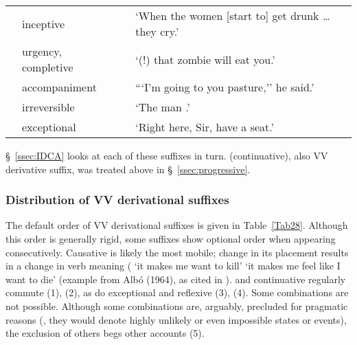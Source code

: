 \begin{table}[!ht]
\begin{small}
\begin{center}
\begin{tabularx}{\textwidth}{l@{ }lL@{ }L}
		&inceptive			& 	&`When the women [start to] get drunk \dots{} they cry.'\\[0.5ex]
		&urgency, completive&	&`(!) that zombie will eat you.'\\[0.5ex]
	&accompaniment		&	&```I'm going to  you pasture,'' he said.'\\[0.5ex]
	&irreversible 		&	&`The man .'\\[0.5ex]
	&exceptional		&	&`Right here, Sir,  have a seat.'\\
\bottomrule
\end{tabularx}
\end{center}
\end{small}
\end{table}

\S~\ref{ssec:IDCA} looks at each of these suffixes in turn.  (continuative), also VV derivative suffix, was treated above in \S~\ref{ssec:progressive}.

\subsubsection{Distribution of VV derivational suffixes}\label{modalsuffixes}
The default order of VV derivational suffixes is given in Table~\ref{Tab28}. Although this order is generally rigid, some suffixes show optional order when appearing consecutively. Causative  is likely the most mobile; change in its placement results in a change in verb meaning ( `it makes me want to kill'  `it makes me feel like I want to die' (example from Alb\'o (1964), as cited in \citealt[284]{CerroP87}).  and continuative  regularly commute (1), (2), as do exceptional  and reflexive  (3), (4). Some combinations are not possible. Although some combinations are, arguably, precluded for pragmatic reasons (\ie{}, they would denote highly unlikely or even impossible states or events), the exclusion of others begs other accounts (5).

